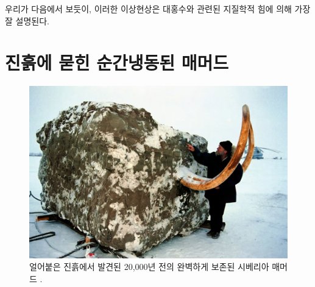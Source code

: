 \documentclass[10pt,twocolumn,letterpaper]{article}
\begin{document}
우리가 다음에서 보듯이, 이러한 이상현상은  대홍수와 관련된 지질학적 힘에 의해 가장 잘 설명된다.

\section{진흙에 묻힌 순간냉동된  매머드}

\begin{figure}[t]
\begin{center}
   \includegraphics[width=1\linewidth]{jarkov-mammoth.jpg}
\end{center}
   \caption{얼어붙은 진흙에서 발견된 20,000년 전의 완벽하게 보존된 시베리아 매머드 \cite{51}.}
\label{fig:1}
\label{fig:onecol}
\end{figure}
\end{document}
